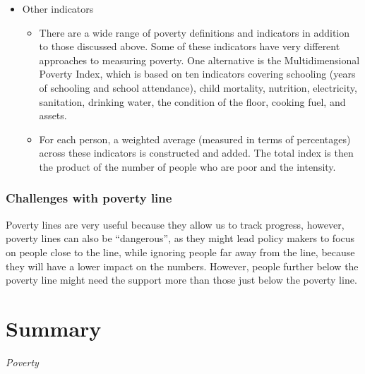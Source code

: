 \documentclass[]{book}
\providecommand{\tightlist}{%
  \setlength{\itemsep}{0pt}\setlength{\parskip}{0pt}}
\begin{document}
\begin{itemize}
\tightlist
\item
  Other indicators

  \begin{itemize}
  \item
    There are a wide range of poverty definitions and indicators in addition to those discussed above. Some of these indicators have very different approaches to measuring poverty. One alternative is the Multidimensional Poverty Index, which is based on ten indicators covering schooling (years of schooling and school attendance), child mortality, nutrition, electricity, sanitation, drinking water, the condition of the floor, cooking fuel, and assets.
  \item
    For each person, a weighted average (measured in terms of percentages) across these indicators is constructed and added. The total index is then the product of the number of people who are poor and the intensity.
  \end{itemize}
\end{itemize}

\hypertarget{challenges-with-poverty-line}{%
\subsubsection{Challenges with poverty line}\label{challenges-with-poverty-line}}

Poverty lines are very useful because they allow us to track progress, however, poverty lines can also be ``dangerous'', as they might lead policy makers to focus on people close to the line, while ignoring people far away from the line, because they will have a lower impact on the numbers. However, people further below the poverty line might need the support more than those just below the poverty line.

\hypertarget{summary-7}{%
\section{Summary}\label{summary-7}}

\emph{Poverty}
\end{document}

